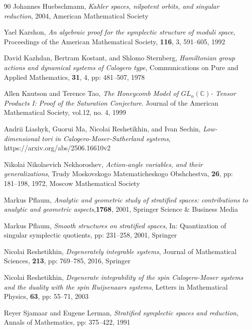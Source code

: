 \documentclass[12pt]{amsart}
\theoremstyle{definition}
\numberwithin{equation}{section}
\begin{document}
{\begin{thebibliography}{90}
 Johannes Huebschmann,   {  \it K$\ddot{\text{a}}$hler spaces, nilpotent orbits, and singular reduction}, 2004, American Mathematical Society


 Yael Karshon,   {\it An algebraic proof for the symplectic structure of moduli space}, Proceedings of the American Mathematical Society, {\bf 116}, 3, 591--605, 1992


David  Kazhdan, Bertram Kostant,   and Shlomo    Sternberg,   {\it Hamiltonian group actions and dynamical systems of Calogero type}, Communications on Pure and Applied Mathematics, {\bf 31}, 4, pp: 481--507, 1978


Allen Knutson   and  Terence Tao, {\it  The Honeycomb Model of $GL_n( \mathbb{C})$- Tensor Products I: Proof of the Saturation Conjecture}. Journal of the American Mathematical Society, vol.12, no. 4, 1999


 Andrii Liashyk,    Guorui Ma,  Nicolai Reshetikhin,   and Ivan Sechin,  
{\it Low-dimensional tori in Calogero-Moser-Sutherland systems},  https://arxiv.org/abs/2506.16610v2


Nikolai Nikolaevich Nekhoroshev, {\it Action-angle variables, and their generalizations}, Trudy Moskovskogo Matematicheskogo Obshchestva, {\bf 26}, pp: 181--198, 1972, Moscow Mathematical Society

 Markus Pflaum,  {\it Analytic and geometric study of stratified spaces: contributions to analytic and geometric aspects},{\bf 1768}, 2001, Springer Science \& Business Media

Markus Pflaum,   {\it Smooth structures on stratified spaces},
	In: Quantization of singular symplectic quotients, pp: 231--258, 2001, Springer


 Nicolai Reshetikhin,   {\it Degenerately integrable systems}, Journal of Mathematical Sciences, {\bf 213}, pp: 769--785, 2016, Springer

 Nicolai Reshetikhin,   {\it Degenerate integrability of the spin Calogero-Moser systems and the duality with the spin Ruijsenaars systems}, Letters in Mathematical Physics, {\bf 63}, pp: 55--71, 2003

	
 Reyer Sjamaar    and Eugene Lerman,   {\it Stratified symplectic spaces and reduction}, Annals of Mathematics, pp: 375--422, 1991




\end{thebibliography}}
\end{document}
